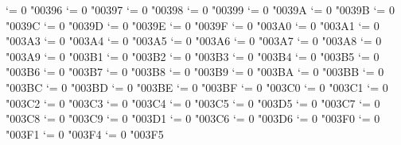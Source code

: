 {  \Umathcode `\Ζ = 0 \unimathfam "00396
  \Umathcode `\Η = 0 \unimathfam "00397
  \Umathcode `\Θ = 0 \unimathfam "00398
  \Umathcode `\Ι = 0 \unimathfam "00399
  \Umathcode `\Κ = 0 \unimathfam "0039A
  \Umathcode `\Λ = 0 \unimathfam "0039B
  \Umathcode `\Μ = 0 \unimathfam "0039C
  \Umathcode `\Ν = 0 \unimathfam "0039D
  \Umathcode `\Ξ = 0 \unimathfam "0039E
  \Umathcode `\Ο = 0 \unimathfam "0039F
  \Umathcode `\Π = 0 \unimathfam "003A0
  \Umathcode `\Ρ = 0 \unimathfam "003A1
  \Umathcode `\Σ = 0 \unimathfam "003A3
  \Umathcode `\Τ = 0 \unimathfam "003A4
  \Umathcode `\Υ = 0 \unimathfam "003A5
  \Umathcode `\Φ = 0 \unimathfam "003A6
  \Umathcode `\Χ = 0 \unimathfam "003A7
  \Umathcode `\Ψ = 0 \unimathfam "003A8
  \Umathcode `\Ω = 0 \unimathfam "003A9
  \Umathcode `\α = 0 \unimathfam "003B1
  \Umathcode `\β = 0 \unimathfam "003B2
  \Umathcode `\γ = 0 \unimathfam "003B3
  \Umathcode `\δ = 0 \unimathfam "003B4
  \Umathcode `\ε = 0 \unimathfam "003B5
  \Umathcode `\ζ = 0 \unimathfam "003B6
  \Umathcode `\η = 0 \unimathfam "003B7
  \Umathcode `\θ = 0 \unimathfam "003B8
  \Umathcode `\ι = 0 \unimathfam "003B9
  \Umathcode `\κ = 0 \unimathfam "003BA
  \Umathcode `\λ = 0 \unimathfam "003BB
  \Umathcode `\μ = 0 \unimathfam "003BC
  \Umathcode `\ν = 0 \unimathfam "003BD
  \Umathcode `\ξ = 0 \unimathfam "003BE
  \Umathcode `\ο = 0 \unimathfam "003BF
  \Umathcode `\π = 0 \unimathfam "003C0
  \Umathcode `\ρ = 0 \unimathfam "003C1
  \Umathcode `\ς = 0 \unimathfam "003C2
  \Umathcode `\σ = 0 \unimathfam "003C3
  \Umathcode `\τ = 0 \unimathfam "003C4
  \Umathcode `\υ = 0 \unimathfam "003C5
  \Umathcode `\φ = 0 \unimathfam "003D5
  \Umathcode `\χ = 0 \unimathfam "003C7
  \Umathcode `\ψ = 0 \unimathfam "003C8
  \Umathcode `\ω = 0 \unimathfam "003C9
  \Umathcode `\ϑ = 0 \unimathfam "003D1
  \Umathcode `\ϕ = 0 \unimathfam "003C6
  \Umathcode `\ϖ = 0 \unimathfam "003D6
  \Umathcode `\ϰ = 0 \unimathfam "003F0
  \Umathcode `\ϱ = 0 \unimathfam "003F1
  \Umathcode `\ϴ = 0 \unimathfam "003F4
  \Umathcode `\ϵ = 0 \unimathfam "003F5
\tenrm}

